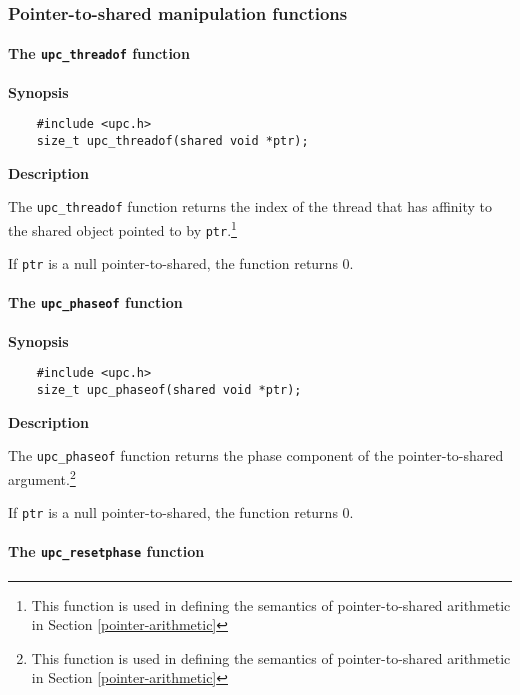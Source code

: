 \cbend

\subsubsection{Pointer-to-shared manipulation functions}

\paragraph{The {\tt upc\_threadof} function}
\label{upc_threadof}

{\bf Synopsis} 

\npf\vspace{-2.5em}
\begin{verbatim}
    #include <upc.h> 
    size_t upc_threadof(shared void *ptr); 
\end{verbatim}

{\bf Description}

\np The {\tt upc\_threadof} function returns the index of the
   thread that has affinity to the shared object pointed to by {\tt ptr}.\footnote{%
   This function is used in defining the semantics of pointer-to-shared
   arithmetic in Section \ref{pointer-arithmetic}}

\np If {\tt ptr} is a null pointer-to-shared, the function returns 0.


\paragraph{The {\tt upc\_phaseof} function}
\label{upc_phaseof}

{\bf Synopsis} 

\npf\vspace{-2.5em}
\begin{verbatim}
    #include <upc.h> 
    size_t upc_phaseof(shared void *ptr); 
\end{verbatim}

{\bf Description}

\np The {\tt upc\_phaseof} function returns the phase component of the
    pointer-to-shared argument.\footnote{%
   This function is used in defining the semantics of pointer-to-shared
   arithmetic in Section \ref{pointer-arithmetic}}

    
\np If {\tt ptr} is a null pointer-to-shared, the function returns 0.

\paragraph{The {\tt upc\_resetphase} function}


